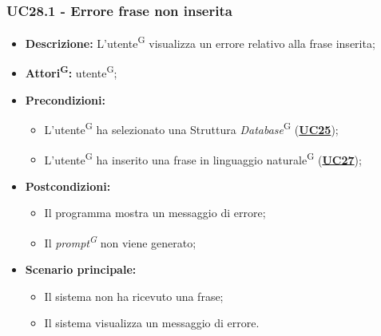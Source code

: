 \subsubsection{UC28.1 - Errore frase non inserita}
\label{sec:UC28.1}
\begin{itemize}
	\item \textbf{Descrizione:} L’utente\textsuperscript{G} visualizza un errore relativo alla frase inserita;
	\item \textbf{Attori\textsuperscript{G}:} utente\textsuperscript{G};
	\item \textbf{Precondizioni:} 
	\begin{itemize}
		\item L’utente\textsuperscript{G} ha selezionato una Struttura \textit{Database}\textsuperscript{G} (\hyperref[sec:UC25]{\textbf{UC25}});
		\item L'utente\textsuperscript{G} ha inserito una frase in linguaggio naturale\textsuperscript{G} (\hyperref[sec:UC27]{\textbf{UC27}});
	\end{itemize}
	\item \textbf{Postcondizioni:} 
	\begin{itemize}
		\item Il programma mostra un messaggio di errore;
		\item Il \textit{prompt\textsuperscript{G}} non viene generato;
	\end{itemize}
	\item \textbf{Scenario principale:} 
	\begin{itemize}
		\item Il sistema non ha ricevuto una frase;
		\item Il sistema visualizza un messaggio di errore.
	\end{itemize}
\end{itemize}



